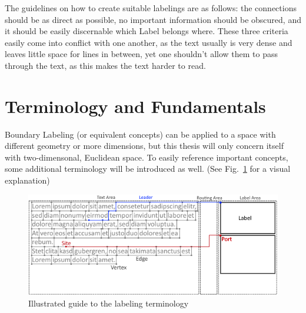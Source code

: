 \documentclass[11pt,a4paper]{vutinfth}
\begin{document}
The guidelines on how to create suitable labelings are as follows: the connections should be as direct as possible, no important information should be obscured, and it should be easily discernable which Label belongs where. These three criteria easily come into conflict with one another, as the text usually is very dense and leaves little space for lines in between, yet one shouldn't allow them to pass through the text, as this makes the text harder to read. 

\section{Terminology and Fundamentals} %
Boundary Labeling (or equivalent concepts) can be applied to a space with different geometry or more dimensions, but this thesis will only concern itself with two-dimensonal, Euclidean space.
To easily reference important concepts, some additional terminology will be introduced as well. (See Fig.~\ref{fig:term} for a visual explanation)


\begin{figure}%
 \captionsetup{justification=centering, margin=0.75cm}
 \centering
  \includegraphics[scale=0.95]{GraphTerminologyExtended.png}
  \caption{Illustrated guide to the labeling terminology}
 \label{fig:term}
\end{figure}
\end{document}
